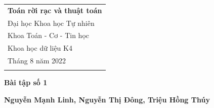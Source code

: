 \documentclass[a4paper,12pt]{article} %
\begin{document}



\thispagestyle{empty} %

\begin{tabular}{p{15.5cm}} %
{\large \bf Toán rời rạc và thuật toán} \\
Đại học Khoa học Tự nhiên \\
Khoa Toán - Cơ - Tin học \\ 
Khoa học dữ liệu K4 \\
Tháng 8 năm 2022  \\ 
\hline %
\\
\end{tabular} %

\vspace*{0.3cm} %

\begin{center} %
	{\Large \bf Bài tập số 1} %
	\vspace{2mm}
	
	{\bf Nguyễn Mạnh Linh, Nguyễn Thị Đông, Triệu Hồng Thúy} %
		
\end{center}  

\vspace{0.4cm}








\end{document}
